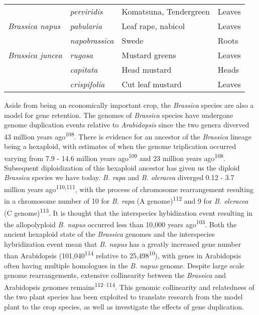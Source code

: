\documentclass[12pt,]{book}
\begin{document}
\begin{table}[htp]
{\begin{tabular}{llll}
                         & \emph{perviridis}        & Komatsuna, Tendergreen   & Leaves \\
\emph{Brassica napus}    & \emph{pabularia}         & Leaf rape, nabicol       & Leaves \\
                         & \emph{napobrassica}      & Swede                    & Roots \\
\emph{Brassica juncea}   & \emph{rugosa}            & Mustard greens           & Leaves \\
                         & \emph{capitata}          & Head mustard             & Heads \\
                         & \emph{crispifolia}       & Cut leaf mustard         & Leaves \\
\bottomrule
\end{tabular}%
}
\end{table}

Aside from being an economically important crop, the \emph{Brassica}
species are also a model for gene retention. The genomes of
\emph{Brassica} species have undergone genome duplication events
relative to \emph{Arabidopsis} since the two genera diverved 43 million
years ago\textsuperscript{108}. There is evidence for an ancestor of the
\emph{Brassica} lineage being a hexaploid, with estimates of when the
genome triplication occurred varying from 7.9 - 14.6 million years
ago\textsuperscript{109} and 23 million years ago\textsuperscript{108}.
Subsequent diploidization of this hexaploid ancestor has given us the
diploid \emph{Brassica} species we have today. \emph{B. rapa} and
\emph{B. oleracea} diverged 0.12 - 3.7 million years
ago\textsuperscript{110,111}, with the process of chromosome
rearrangement resulting in a chromosome number of 10 for \emph{B. rapa}
(A genome)\textsuperscript{112} and 9 for \emph{B. oleracea} (C
genome)\textsuperscript{113}. It is thought that the interspecies
hybidization event resulting in the allopolyploid \emph{B. napus}
occurred less than 10,000 years ago\textsuperscript{103}. Both the
ancient hexaploid state of the \emph{Brassica} genomes and the
interspecies hybridization event mean that \emph{B. napus} has a greatly
increased gene number than Arabidopsis (101,040\textsuperscript{114}
relative to 25,498\textsuperscript{10}), with genes in Arabidopsis often
having multiple homologues in the \emph{B. napus} genome. Despite large
scale genome rearrangements, extensive collinearity between the
\emph{Brassica} and Arabidopsis genomes
remains\textsuperscript{112--114}. This genomic collinearity and
relatedness of the two plant species has been exploited to translate
research from the model plant to the crop species, as well as
investigate the effects of gene duplication.
\end{document}

